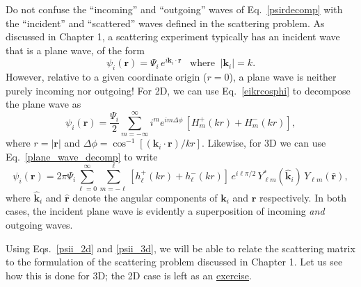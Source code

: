 \documentclass[pra,12pt]{revtex4-2}
\begin{document}
Do not confuse the ``incoming'' and ``outgoing'' waves of
Eq.~\eqref{psirdecomp} with the ``incident'' and ``scattered'' waves
defined in the scattering problem.  As discussed in Chapter 1, a
scattering experiment typically has an incident wave that is a plane
wave, of the form
\begin{equation}
  \psi_i(\mathbf{r}) = \Psi_i \, e^{i\mathbf{k}_i\cdot\mathbf{r}} \;\;\;
  \mathrm{where}\;\; |\mathbf{k}_i| = k.
\end{equation}
However, relative to a given coordinate origin ($r = 0$), a plane wave
is neither purely incoming nor outgoing!  For 2D, we can use
Eq.~\eqref{eikrcosphi} to decompose the plane wave as
\begin{equation}
  \psi_i(\mathbf{r})
  = \frac{\Psi_i}{2} \sum_{m=-\infty}^\infty i^m e^{im \Delta\phi} \,
  \left[H_m^+(kr) + H_m^-(kr)\right],
  \label{psii_2d}
\end{equation}
where $r = |\mathbf{r}|$ and $\Delta \phi =
\cos^{-1}\left[(\mathbf{k}_i\!\cdot\!\mathbf{r})/kr\right]$.
Likewise, for 3D we can use Eq.~\eqref{plane_wave_decomp} to write
\begin{equation}
  \psi_i(\mathbf{r})
  = 2\pi \Psi_i \sum_{\ell=0}^\infty \sum_{m=-\ell}^\ell
  \left[h_{\ell}^+(kr) + h_{\ell}^-(kr) \right] \, e^{i\ell\pi/2} \,
  Y_{\ell m}^*(\hat{\mathbf{k}}_i) \, Y_{\ell m}(\hat{\mathbf{r}}),
  \label{psii_3d}
\end{equation}
where $\hat{\mathbf{k}}_i$ and $\hat{\mathbf{r}}$ denote the angular
components of $\mathbf{k}_i$ and $\mathbf{r}$ respectively.  In both
cases, the incident plane wave is evidently a superposition of
incoming \textit{and} outgoing waves.

Using Eqs.~\eqref{psii_2d} and \eqref{psii_3d}, we will be able to
relate the scattering matrix to the formulation of the scattering
problem discussed in Chapter 1.  Let us see how this is done for 3D;
the 2D case is left as an \hyperref[ex:2dscattering]{exercise}.
\end{document}
